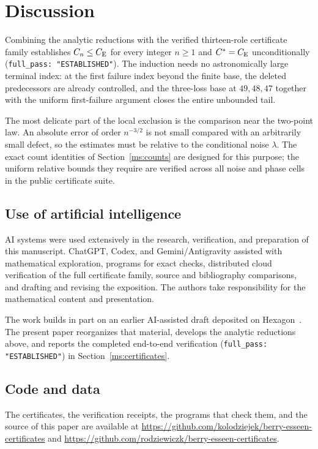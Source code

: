 \section{Discussion}\label{ms:discussion}

Combining the analytic reductions with the verified thirteen-role certificate
family establishes $C_n\le C_{\mathrm E}$ for every integer $n\ge1$ and $C^*=C_{\mathrm E}$
unconditionally (\texttt{full\_pass: "ESTABLISHED"}). The induction needs no
astronomically large terminal index: at the first failure index beyond the
finite base, the deleted predecessors are already controlled, and the
three-loss base at $49,48,47$ together with the uniform first-failure argument
closes the entire unbounded tail.

The most delicate part of the local exclusion is the comparison near the
two-point law. An absolute error of order $n^{-3/2}$ is not small compared
with an arbitrarily small defect, so the estimates must be relative to the
conditional noise $\lambda$. The exact count identities of
Section~\ref{ms:counts} are designed for this purpose; the uniform
relative bounds they require are verified across all noise and phase cells in
the public certificate suite.

\subsection*{Use of artificial intelligence}

AI systems were used extensively in the research, verification, and preparation
of this manuscript. ChatGPT, Codex, and Gemini/Antigravity assisted with
mathematical exploration, programs for exact checks, distributed cloud
verification of the full certificate family, source and bibliography
comparisons, and drafting and revising the exposition. The authors take
responsibility for the mathematical content and presentation.

The work builds in part on an earlier AI-assisted draft deposited on
Hexagon~\cite{rodziewiczkolodziejek2026momentdefects}. The present paper
reorganizes that material, develops the analytic reductions above, and reports
the completed end-to-end verification (\texttt{full\_pass: "ESTABLISHED"}) in
Section~\ref{ms:certificates}.

\subsection*{Code and data}

The certificates, the verification receipts, the programs that check them, and
the source of this paper are available at
\url{https://github.com/kolodziejek/berry-esseen-certificates} and
\url{https://github.com/rodziewiczk/berry-esseen-certificates}.
